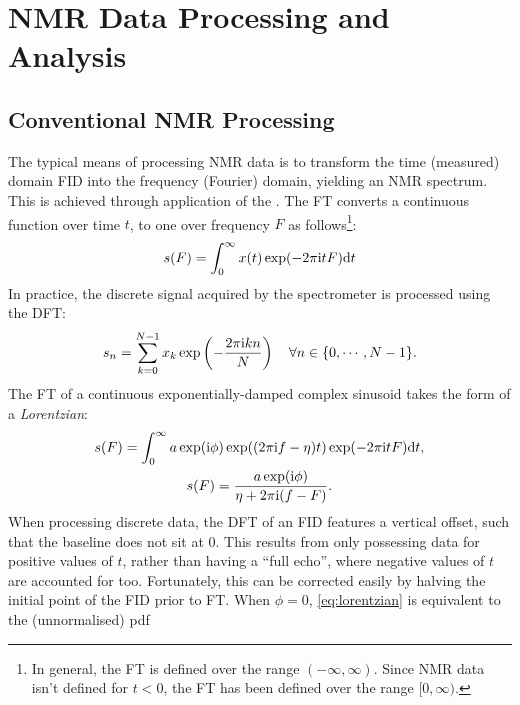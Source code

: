 \section{\acs{NMR} Data Processing and Analysis}

\subsection{Conventional NMR Processing}
\label{subsec:nmr-proc}
The typical means of processing \ac{NMR} data is to
transform the time (measured) domain \ac{FID} into the frequency (Fourier)
domain, yielding an \ac{NMR} spectrum. This is achieved through application of
the
. The \ac{FT} converts a continuous function over time $t$, to one
over frequency $F$ as follows\footnote{
    In general, the \ac{FT} is defined over the range $(-\infty, \infty)$.
    Since \ac{NMR} data isn't defined for $t < 0$, the \ac{FT} has been defined
    over the range  $[0, \infty)$.
}:
\begin{equation}
    s(F) =  \int_{0}^{\infty} x(t) \exp(
        -2 \pi \mathrm{i} t F
        ) \mathrm{d} t
\end{equation}
In practice, the discrete signal acquired by the spectrometer is processed
using the \ac{DFT}:
\begin{equation}
    s_n = \sum_{k=0}^{N-1} x_k \exp \left(
            -\frac{2 \pi \mathrm{i} k n}{N} \right)
            \quad \forall n \in \lbrace 0, \cdots, N-1 \rbrace.
\end{equation}
The \ac{FT} of a continuous exponentially-damped complex sinusoid
takes the form of a \emph{Lorentzian}:
\begin{subequations}
    \begin{gather}
        s(F) = \int_0^{\infty}
            a \exp(\mathrm{i} \phi) \exp((2 \pi \mathrm{i} f - \eta)t)
            \exp(-2 \pi \mathrm{i} t F)
            \mathrm{d} t,\\
        s(F) = \frac{a \exp(\mathrm{i} \phi) }
            {\eta + 2 \pi \mathrm{i} (f - F)}.
    \end{gather}
    \label{eq:lorentzian}%
\end{subequations}
When processing discrete data, the \ac{DFT} of an \ac{FID}
features a vertical offset, such that the baseline does not sit at
0\cite{Tang1994}. This results from only possessing data for positive
values of $t$, rather than having a ``full echo'', where negative values of
$t$ are accounted for too. Fortunately, this can be corrected easily by
halving the initial point of the \ac{FID} prior to \ac{FT}.
When $\phi = 0$, \cref{eq:lorentzian} is equivalent to the (unnormalised) \ac{pdf}
